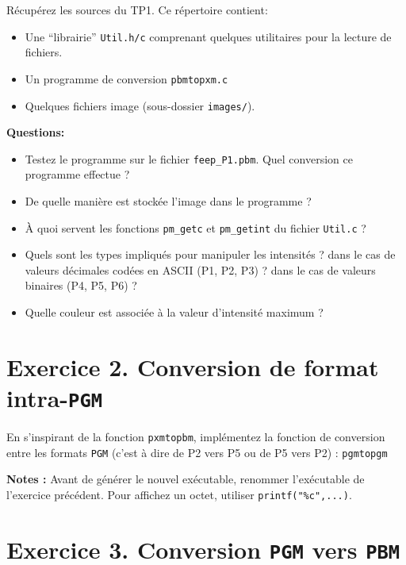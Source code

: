 \documentclass[a4paper, 11pt, french]{article}
\begin{document}
\par Récupérez les sources du TP1. Ce répertoire contient:
\begin{itemize}
	\item Une ``librairie'' \texttt{Util.h/c} comprenant quelques utilitaires pour la lecture de fichiers.
	\item Un programme de conversion \texttt{pbmtopxm.c}
	\item Quelques fichiers image (sous-dossier \texttt{images/}).
\end{itemize}

\bigskip
\noindent \textbf{Questions:}
\begin{itemize}
	\item Testez le programme sur le fichier \texttt{feep\_P1.pbm}. Quel conversion ce programme effectue ?
	\item De quelle manière est stockée l'image dans le programme ? 
	\item À quoi servent les fonctions \texttt{pm\_getc} et \texttt{pm\_getint} du fichier \texttt{Util.c} ?
	\item Quels sont les types impliqués pour manipuler les intensités ? dans le cas de valeurs décimales codées en ASCII (P1, P2, P3) ? dans le cas de valeurs binaires (P4, P5, P6) ? 
	\item Quelle couleur est associée à la valeur d'intensité maximum ?
\end{itemize}


\section*{\bf Exercice 2. \rm Conversion de format intra-\texttt{PGM}}

\par En s'inspirant de la fonction \texttt{pxmtopbm}, implémentez la fonction de conversion entre les formats \texttt{PGM} (c'est à dire de P2 vers P5 ou de P5 vers P2) : \texttt{pgmtopgm}

\par {\bf Notes :} Avant de générer le nouvel exécutable, renommer l'exécutable de l'exercice précédent. Pour affichez un octet, utiliser \texttt{printf("\%c",...)}.

\section*{\bf Exercice 3. \rm Conversion \texttt{PGM} vers \texttt{PBM}}
\end{document}
